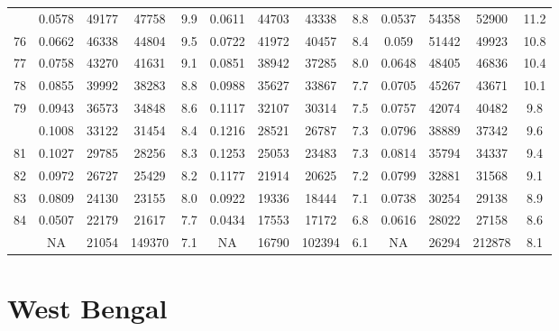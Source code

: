 \documentclass[
  14pt,
]{article}
\begin{document}
\begin{longtable}[t]{lcccccccccccc}
\addlinespace
75 & 0.0578 & 49177 & 47758 & 9.9 & 0.0611 & 44703 & 43338 & 8.8 & 0.0537 & 54358 & 52900 & 11.2\\
76 & 0.0662 & 46338 & 44804 & 9.5 & 0.0722 & 41972 & 40457 & 8.4 & 0.059 & 51442 & 49923 & 10.8\\
77 & 0.0758 & 43270 & 41631 & 9.1 & 0.0851 & 38942 & 37285 & 8.0 & 0.0648 & 48405 & 46836 & 10.4\\
78 & 0.0855 & 39992 & 38283 & 8.8 & 0.0988 & 35627 & 33867 & 7.7 & 0.0705 & 45267 & 43671 & 10.1\\
79 & 0.0943 & 36573 & 34848 & 8.6 & 0.1117 & 32107 & 30314 & 7.5 & 0.0757 & 42074 & 40482 & 9.8\\
\addlinespace
80 & 0.1008 & 33122 & 31454 & 8.4 & 0.1216 & 28521 & 26787 & 7.3 & 0.0796 & 38889 & 37342 & 9.6\\
81 & 0.1027 & 29785 & 28256 & 8.3 & 0.1253 & 25053 & 23483 & 7.3 & 0.0814 & 35794 & 34337 & 9.4\\
82 & 0.0972 & 26727 & 25429 & 8.2 & 0.1177 & 21914 & 20625 & 7.2 & 0.0799 & 32881 & 31568 & 9.1\\
83 & 0.0809 & 24130 & 23155 & 8.0 & 0.0922 & 19336 & 18444 & 7.1 & 0.0738 & 30254 & 29138 & 8.9\\
84 & 0.0507 & 22179 & 21617 & 7.7 & 0.0434 & 17553 & 17172 & 6.8 & 0.0616 & 28022 & 27158 & 8.6\\
\addlinespace
85 & NA & 21054 & 149370 & 7.1 & NA & 16790 & 102394 & 6.1 & NA & 26294 & 212878 & 8.1\\*
\end{longtable}

\pagebreak

\hypertarget{west-bengal}{%
\section{West Bengal}\label{west-bengal}}
\end{document}

